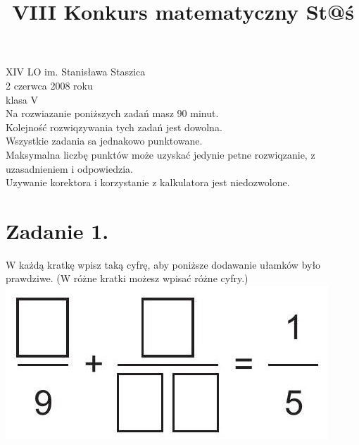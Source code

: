 \documentclass[10pt]{article}
\title{VIII Konkurs matematyczny St@ś }
\author{}
\date{}
\begin{document}
\maketitle
XIV LO im. Stanisława Staszica\\
2 czerwca 2008 roku\\
klasa V\\
Na rozwiazanie poniższych zadań masz 90 minut.\\
Kolejność rozwiqzywania tych zadań jest dowolna.\\
Wszystkie zadania sa jednakowo punktowane.\\
Maksymalna liczbę punktów może uzyskać jedynie petne rozwiqzanie, z uzasadnieniem i odpowiedzia.\\
Uzywanie korektora i korzystanie z kalkulatora jest niedozwolone.

\section*{Zadanie 1.}
W każdą kratkę wpisz taką cyfrę, aby poniższe dodawanie ułamków było prawdziwe. (W różne kratki możesz wpisać różne cyfry.)\\
\includegraphics[max width=\textwidth, center]{2024_11_21_a60e976091171712aedfg-1(1)}
\end{document}
